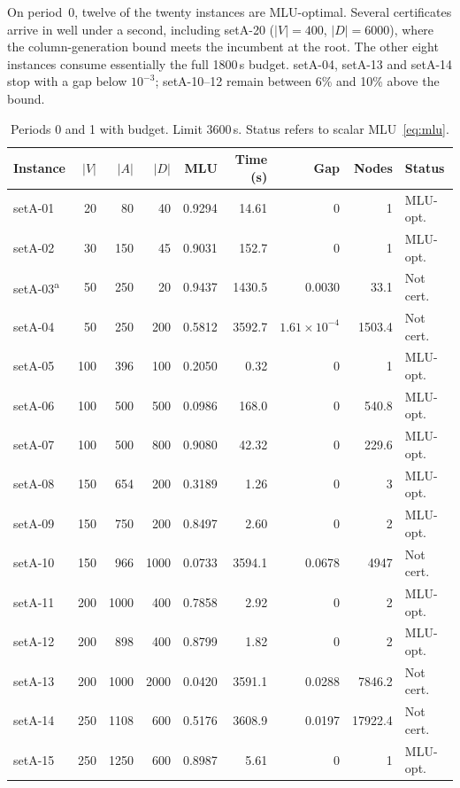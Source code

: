 On period~0, twelve of the twenty instances are MLU-optimal.
Several certificates arrive in well under a second, including setA-20 ($|V|=400$, $|D|=6000$),
where the column-generation bound meets the incumbent at the root.
The other eight instances consume essentially the full 1800\,s budget.
setA-04, setA-13 and setA-14 stop with a gap below $10^{-3}$; setA-10--12 remain between
6\% and 10\% above the bound.

\begin{table}[h!]
\centering
\caption{Periods 0 and 1 with budget. Limit 3600\,s. Status refers to scalar MLU~\eqref{eq:mlu}.}
\label{tab:full}
\renewcommand{\arraystretch}{1.15}
\footnotesize
\setlength{\tabcolsep}{4.5pt}
\begin{tabular}{@{}lrrrrrrrl@{}}
\toprule
\textbf{Instance} & \textbf{$|V|$} & \textbf{$|A|$} & \textbf{$|D|$} &
\textbf{MLU} & \textbf{Time (s)} & \textbf{Gap} & \textbf{Nodes} & \textbf{Status} \\
\midrule
setA-01 & 20 & 80 & 40 & 0.9294 & 14.61 & 0 & 1 & MLU-opt. \\
setA-02 & 30 & 150 & 45 & 0.9031 & 152.7 & 0 & 1 & MLU-opt. \\
setA-03\textsuperscript{a} & 50 & 250 & 20 & 0.9437 & 1430.5 & 0.0030 & 33.1 & Not cert. \\
setA-04 & 50 & 250 & 200 & 0.5812 & 3592.7 & $1.61\times 10^{-4}$ & 1503.4 & Not cert. \\
setA-05 & 100 & 396 & 100 & 0.2050 & 0.32 & 0 & 1 & MLU-opt. \\
setA-06 & 100 & 500 & 500 & 0.0986 & 168.0 & 0 & 540.8 & MLU-opt. \\
setA-07 & 100 & 500 & 800 & 0.9080 & 42.32 & 0 & 229.6 & MLU-opt. \\
setA-08 & 150 & 654 & 200 & 0.3189 & 1.26 & 0 & 3 & MLU-opt. \\
setA-09 & 150 & 750 & 200 & 0.8497 & 2.60 & 0 & 2 & MLU-opt. \\
setA-10 & 150 & 966 & 1000 & 0.0733 & 3594.1 & 0.0678 & 4947 & Not cert. \\
setA-11 & 200 & 1000 & 400 & 0.7858 & 2.92 & 0 & 2 & MLU-opt. \\
setA-12 & 200 & 898 & 400 & 0.8799 & 1.82 & 0 & 2 & MLU-opt. \\
setA-13 & 200 & 1000 & 2000 & 0.0420 & 3591.1 & 0.0288 & 7846.2 & Not cert. \\
setA-14 & 250 & 1108 & 600 & 0.5176 & 3608.9 & 0.0197 & 17922.4 & Not cert. \\
setA-15 & 250 & 1250 & 600 & 0.8987 & 5.61 & 0 & 1 & MLU-opt. \\

\end{tabular}
\end{table}

